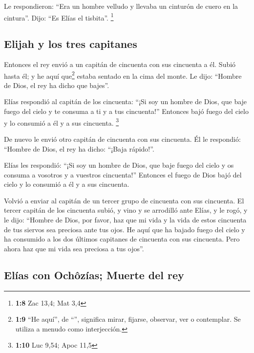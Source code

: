 \begin{paracol}{2}
 Le respondieron: ``Era un hombre velludo y llevaba un
cinturón de cuero en la cintura''. Dijo: ``Es Elías el tisbita''.
\footnote{\textbf{1:8} Zac 13,4; Mat 3,4}

\hypertarget{elijah-y-los-tres-capitanes}{%
\subsection{Elijah y los tres
capitanes}\label{elijah-y-los-tres-capitanes}}

 Entonces el rey envió a un capitán de cincuenta con sus
cincuenta a él. Subió hasta él; y he aquí que\footnote{\textbf{1:9} ``He
  aquí'', de ``'', significa mirar, fijarse, observar, ver o
  contemplar. Se utiliza a menudo como interjección.} estaba sentado en
la cima del monte. Le dijo: ``Hombre de Dios, el rey ha dicho que
bajes''.

 Elías respondió al capitán de los cincuenta: ``¡Si soy
un hombre de Dios, que baje fuego del cielo y te consuma a ti y a tus
cincuenta!'' Entonces bajó fuego del cielo y lo consumió a él y a sus
cincuenta. \footnote{\textbf{1:10} Luc 9,54; Apoc 11,5}

 De nuevo le envió otro capitán de cincuenta con sus
cincuenta. Él le respondió: ``Hombre de Dios, el rey ha dicho: ``¡Baja
rápido!''.

 Elías les respondió: ``¡Si soy un hombre de Dios, que
baje fuego del cielo y os consuma a vosotros y a vuestros cincuenta!''
Entonces el fuego de Dios bajó del cielo y lo consumió a él y a sus
cincuenta.

 Volvió a enviar al capitán de un tercer grupo de
cincuenta con sus cincuenta. El tercer capitán de los cincuenta subió, y
vino y se arrodilló ante Elías, y le rogó, y le dijo: ``Hombre de Dios,
por favor, haz que mi vida y la vida de estos cincuenta de tus siervos
sea preciosa ante tus ojos.  He aquí que ha bajado fuego
del cielo y ha consumido a los dos últimos capitanes de cincuenta con
sus cincuenta. Pero ahora haz que mi vida sea preciosa a tus ojos''.

\hypertarget{eluxedas-con-ochuxf4zuxedas-muerte-del-rey}{%
\subsection{Elías con Ochôzías; Muerte del
rey}\label{eluxedas-con-ochuxf4zuxedas-muerte-del-rey}}


\end{paracol}
